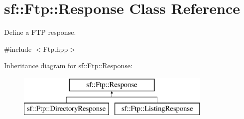 \hypertarget{classsf_1_1Ftp_1_1Response}{\section{sf\-:\-:Ftp\-:\-:Response Class Reference}
\label{classsf_1_1Ftp_1_1Response}
}


Define a F\-T\-P response.  




{\ttfamily \#include $<$Ftp.\-hpp$>$}

Inheritance diagram for sf\-:\-:Ftp\-:\-:Response\-:\begin{figure}[H]
\begin{center}
\leavevmode
\includegraphics[height=2.000000cm]{classsf_1_1Ftp_1_1Response}
\end{center}
\end{figure}

